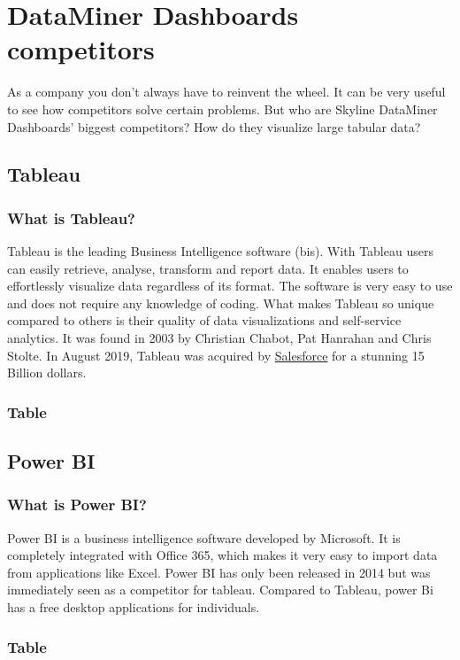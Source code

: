     \section{DataMiner Dashboards competitors}
        As a company you don't always have to reinvent the wheel. It can be very useful to see how competitors solve certain problems. But who are Skyline DataMiner Dashboards' biggest competitors? How do they visualize large tabular data?
        
        \subsection{Tableau}
        \subsubsection{What is Tableau?}
        Tableau is the leading Business Intelligence software (\gls{bis}). With Tableau users can easily retrieve, analyse, transform and report data. It enables users to effortlessly visualize data regardless of its format. The software is very easy to use and does not require any knowledge of coding. What makes Tableau so unique compared to others is their quality of data visualizations and self-service analytics. It was found in 2003 by Christian Chabot, Pat Hanrahan and Chris Stolte. In August 2019, Tableau was acquired by \href{https://www.salesforce.com/}{Salesforce} for a stunning 15 Billion dollars.
        
       \subsubsection{Table} 
        \subsection{Power BI}
        \subsubsection{What is Power BI?}
        Power BI is a business intelligence software developed by Microsoft. It is completely integrated with Office 365, which makes it very easy to import data from applications like Excel. Power BI has only been released in 2014 but was immediately seen as a competitor for tableau. Compared to Tableau, power Bi has a free desktop applications for individuals.
        
        \subsubsection{Table}
        
